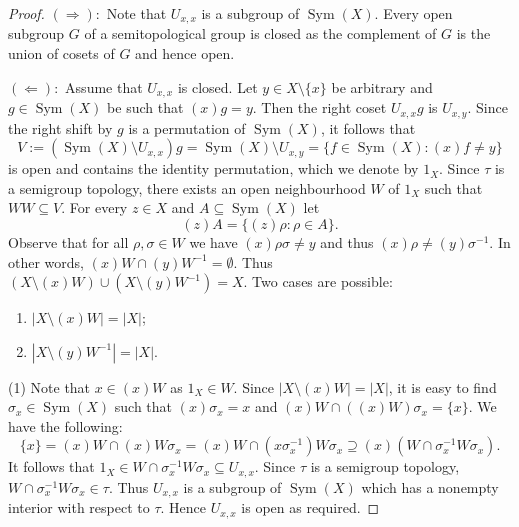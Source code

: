 \documentclass[11pt]{amsart}
\theoremstyle{definition}
\newcommand{\N}{\mathbb N}
\newcommand{\Sym}{\operatorname{Sym}}
\begin{document}
\begin{proof}
\((\Rightarrow):\) Note that $U_{x,x}$ is a subgroup of $\Sym(X)$. Every open subgroup $G$ of a semitopological group is closed as the complement of \(G\) is the union of cosets of $G$ and hence open.

\((\Leftarrow):\) Assume that $U_{x,x}$ is closed. Let \(y\in X\setminus \{x\}\) be arbitrary and \(g\in \Sym(X)\) be such that \((x)g= y\).
Then the right coset ${U_{x,x}}g$ is $U_{x,y}$. Since the right shift by $g$ is a permutation of $\Sym(X)$, it follows that 
\[V:=(\Sym(X)\setminus U_{x,x})g=\Sym(X)\setminus U_{x,y}=\{f\in \Sym(X): (x)f \neq y\}\]
is open and contains the identity permutation, which we denote by \(1_{X}\). Since $\tau$ is a semigroup topology, there exists an open neighbourhood  \(W\) of \(1_{X}\) such that \(WW\subseteq V\). For every $z\in X$ and $A \subseteq \Sym(X)$ let $$(z)A=\{(z)\rho: \rho\in A\}.$$ Observe that for all \(\rho,\sigma \in W\) we have \((x)\rho\sigma \neq y\) and thus \((x)\rho \neq (y)\sigma^{-1}\). In other words, 
$(x)W\cap (y)W^{-1} =\emptyset$.  Thus \((X\setminus (x)W)\cup (X\setminus (y)W^{-1}) =X\). Two cases are possible:
\begin{enumerate}
    \item \(|X\setminus (x)W|= |X|\);
    \item \(|X\setminus (y)W^{-1}|= |X|\).
\end{enumerate}

(1) Note that \(x\in (x)W\) as \(1_X\in W\). Since $|X\setminus (x)W|=|X|$, it is easy to find \(\sigma_x\in \Sym(X)\) such that \((x)\sigma_x=x\) and \((x)W\cap ((x)W)\sigma_x = \{x\}\). We have the following:
\[\{x\}= (x)W\cap (x)W\sigma_x= (x)W \cap (x\sigma_x^{-1})W\sigma_x\supseteq (x)(W\cap \sigma_x^{-1} W \sigma_x).\]
It follows that \(1_X\in W\cap \sigma_x^{-1} W \sigma_x \subseteq U_{x,x}\). Since $\tau$ is a semigroup topology, \(W\cap \sigma_x^{-1} W \sigma_x\in\tau\). Thus \(U_{x,x}\) is a subgroup of $\Sym(X)$ which has a nonempty interior with respect to $\tau$. Hence \(U_{x,x}\) is open as required.



\end{proof}
\end{document}
